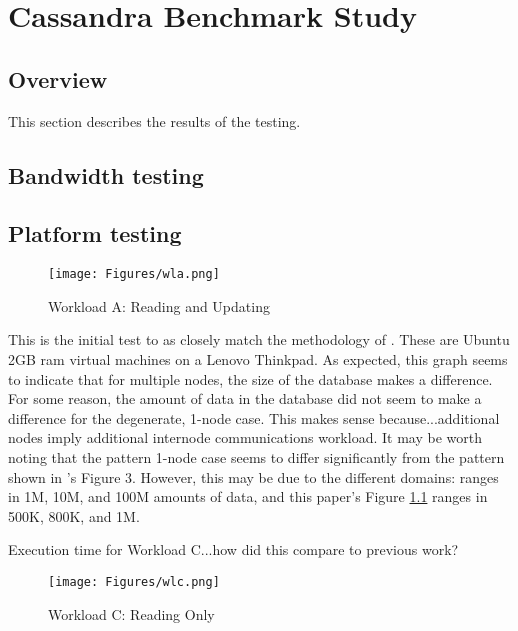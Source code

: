 \chapter{Cassandra Benchmark Study}

\label{Chapter4}
\label{Cassandra Benchmark Study}


\section{Overview}
This section describes the results of the testing.
\section{Bandwidth testing}
\section{Platform testing}

\begin{figure}[h]
\texttt{[image: Figures/wla.png]}

\caption{Workload A: Reading and Updating}

\label{fig:wla}
\end{figure}

This is the initial test to as closely match the methodology of \cite{Abramova2014TestingCassandra}.  These are Ubuntu 2GB \gls{ram} virtual machines on a Lenovo Thinkpad.
As expected, this graph seems to indicate that for multiple nodes, the size of the database makes a difference.
For some reason, the amount of data in the database did not seem to make a difference for the degenerate, 1-node case.
This makes sense because...additional nodes imply additional internode communications workload.
It may be worth noting that the pattern 1-node case seems to differ significantly from the pattern shown in \cite{Abramova2014TestingCassandra}'s Figure 3.  However, this may be due to the different domains: \cite{Abramova2014TestingCassandra} ranges in 1M, 10M, and 100M amounts of data, and this paper's Figure \ref{fig:wla} ranges in 500K, 800K, and 1M.

Execution time for Workload C...how did this compare to previous work?

\begin{figure}[h]
\texttt{[image: Figures/wlc.png]}

\caption{Workload C: Reading Only}

\label{fig:wlc}
\end{figure}

